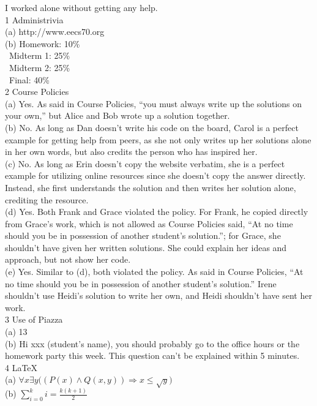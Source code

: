 \documentclass{article}
\begin{document}
I worked alone without getting any help. \\[.3cm]

{\Large 1 Administrivia} \\[.3cm]
{\normalsize (a) http://www.eecs70.org} \\[.15cm]
(b) Homework: 10\%\\
\indent \ Midterm 1: 25\%\\
\indent \ Midterm 2: 25\%\\
\indent \ Final: 40\%\\[.25cm]

{\Large 2 Course Policies} \\[.3cm]
(a) Yes. As said in Course Policies, ``you must always write up the solutions on your own,'' but Alice and Bob wrote up a solution together. \\[.15cm]
(b) No. As long as Dan doesn't write his code on the board, Carol is a perfect example for getting help from peers, as she not only writes up her solutions alone in her own words, but also credits the person who has inspired her. \\[.15cm]
(c) No. As long as Erin doesn't copy the website verbatim, she is a perfect example for utilizing online resources since she doesn't copy the answer directly. Instead, she first understands the solution and then writes her solution alone, crediting the resource. \\[.15cm]
(d) Yes. Both Frank and Grace violated the policy. For Frank, he copied directly from Grace's work, which is not allowed as Course Policies said, ``At no time should you be in possession of another student's solution.''; for Grace, she shouldn't have given her written solutions. She could explain her ideas and approach, but not show her code. \\[.15cm]
(e) Yes. Similar to (d), both violated the policy. As said in Course Policies, ``At no time should you be in possession of another student's solution.'' Irene shouldn't use Heidi's solution to write her own, and Heidi shouldn't have sent her work.\\[.25cm]

{\Large 3 Use of Piazza} \\[.3cm]
(a) 13 \\[.15cm]
(b) Hi xxx (student's name), you should probably go to the office hours or the homework party this week. This question can't be explained within 5 minutes.\\[.25cm]

{\Large 4 \LaTeX} \\[.3cm]
(a) $ \forall x \exists y \big((P(x) \land Q(x, y)) \Longrightarrow x \leq \sqrt{y} \big) $ \\[.15cm]
(b) $ \sum\limits_{i=0}^{k} i = \frac{k(k+1)}{2} $
\end{document}
